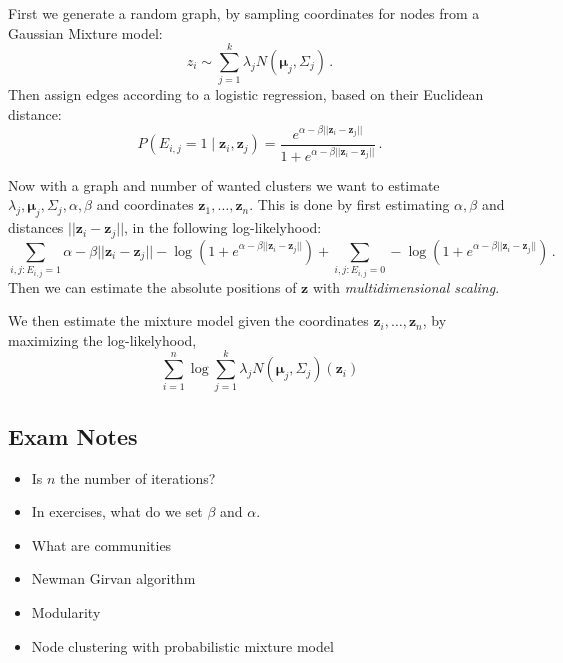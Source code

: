 First we generate a random graph, by sampling coordinates for nodes from a Gaussian Mixture model:
\[
    z_i \sim \sum_{j=1}^k \lambda_j N(\mathbf{\mu}_j, \Sigma_j)\,.
\]
Then assign edges according to a logistic regression, based on their Euclidean distance:
\[
    P(E_{i,j} = 1 \mid \mathbf{z}_i, \mathbf{z}_j) = \frac {e^{\alpha - \beta || \mathbf{z}_i - \mathbf{z}_j ||}} {1 + e^{\alpha - \beta || \mathbf{z}_i - \mathbf{z}_j ||}}\,.
\]

Now with a graph and number of wanted clusters we want to estimate $\lambda_j, \mathbf{\mu}_j, \Sigma_j, \alpha, \beta$ and coordinates $\mathbf{z}_1, \dots, \mathbf{z}_n$.
This is done by first estimating $\alpha, \beta$ and distances $|| \mathbf{z}_i - \mathbf{z}_j||$, in the following log-likelyhood:
\[
    \sum_{i,j:E_{i,j}=1} \alpha - \beta || \mathbf{z}_i - \mathbf{z}_j|| - \log\left(1 + e^{\alpha - \beta || \mathbf{z}_i - \mathbf{z}_j||}\right)
    + \sum_{i,j:E_{i,j}=0} -\log\left(1 + e^{\alpha - \beta || \mathbf{z}_i - \mathbf{z}_j||}\right)\,.
\]
Then we can estimate the absolute positions of $\mathbf{z}$ with \emph{multidimensional scaling}.

We then estimate the mixture model given the coordinates $\mathbf{z}_i, \dots, \mathbf{z}_n$, by maximizing the log-likelyhood,
\[
    \sum_{i=1}^n \log \sum_{j=1}^k \lambda_j N(\mathbf{\mu}_j, \Sigma_j)(\mathbf{z}_i)
\]

\subsection{Exam Notes}

\begin{mdframed}[frametitle={Questions that Need Answering}]
    \begin{itemize}
        \item Is $n$ the number of iterations?
        \item In exercises, what do we set $\beta$ and $\alpha$.
    \end{itemize}
\end{mdframed}

\begin{itemize}
    \item What are communities
    \item Newman Girvan algorithm
    \item Modularity
    \item Node clustering with probabilistic mixture model
\end{itemize}


